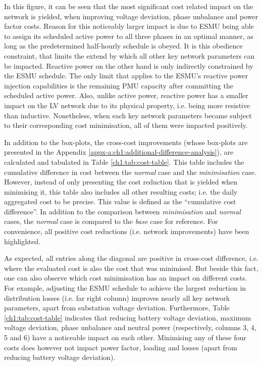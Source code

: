 In this figure, it can be seen that the most significant cost related impact on the network is yielded, when improving voltage deviation, phase unbalance and power factor costs.
Reason for this noticeably larger impact is due to ESMU being able to assign its scheduled active power to all three phases in an optimal manner, as long as the predetermined half-hourly schedule is obeyed.
It is this obedience constraint, that limits the extend by which all other key network parameters can be impacted.
Reactive power on the other hand is only indirectly constrained by the ESMU schedule.
The only limit that applies to the ESMU's reactive power injection capabilities is the remaining PMU capacity after committing the scheduled active power.
Also, unlike active power, reactive power has a smaller impact on the LV network due to its physical property, i.e. being more resistive than inductive.
Nonetheless, when each key network parameters became subject to their corresponding cost minimisation, all of them were impacted positively.

In addition to the box-plots, the cross-cost improvements (whose box-plots are presented in the Appendix \ref{appx-a:ch1:additional-difference-analysis}), are calculated and tabulated in Table \ref{ch1:tab:cost-table}.
This table includes the cumulative difference in cost between the \textit{normal} case and the \textit{minimisation} case.
However, instead of only presenting the cost reduction that is yielded when minimising it, this table also includes all other resulting costs; i.e. the daily aggregated cost to be precise.
This value is defined as the ``cumulative cost difference''.
In addition to the comparison between \textit{minimisation} and \textit{normal} cases, the \textit{normal} case is compared to the \textit{base} case for reference.
For convenience, all positive cost reductions (i.e. network improvements) have been highlighted.



As expected, all entries along the diagonal are positive in cross-cost difference, i.e. where the evaluated cost is also the cost that was minimised.
But beside this fact, one can also observe which cost minimisation has an impact on different costs.
For example, adjusting the ESMU schedule to achieve the largest reduction in distribution losses (i.e. far right column) improves nearly all key network parameters, apart from substation voltage deviation.
Furthermore, Table \ref{ch1:tab:cost-table} indicates that reducing battery voltage deviation, maximum voltage deviation, phase unbalance and neutral power (respectively, columns 3, 4, 5 and 6) have a noticeable impact on each other.
Minimising any of these four costs does however not impact power factor, loading and losses (apart from reducing battery voltage deviation).

